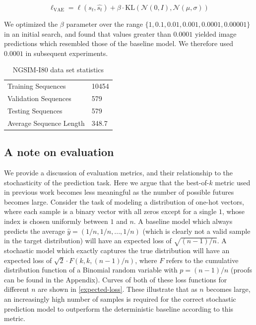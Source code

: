 \documentclass{article}
\begin{document}
\begin{appendices}
  \begin{equation}
    \ell_{\text{VAE}} = \ell(s_t, \hat{s_t}) + \beta \cdot \mbox{KL}(\mathcal{N}(0, I), \mathcal{N}(\mu, \sigma))
  \end{equation}

  We optimized the $\beta$ parameter over the range $\{1, 0.1, 0.01, 0.001, 0.0001, 0.00001 \}$ in an initial search, and found that values greater than $0.0001$ yielded image predictions which resembled those of the baseline model.
  We therefore used $0.0001$ in subsequent experiments.

  \begin{table}
    \caption{NGSIM-I80 data set statistics}
    \label{i80-stats}
    \centering
    \begin{tabular}{ll}
      \toprule
      Training Sequences     & 10454 \\
      Validation Sequences & 579 \\
      Testing Sequences & 579 \\
      Average Sequence Length & 348.7 \\
      \bottomrule
    \end{tabular}
  \end{table}

  \subsection{A note on evaluation} \label{proof}

  We provide a discussion of evaluation metrics, and their relationship to the stochasticity of the prediction task.
  Here we argue that the best-of-$k$ metric used in previous work \citep{Walker2016, Babaeizadeh2018, Denton2018} becomes less meaningful as the number of possible futures becomes large.
  Consider the task of modeling a distribution of one-hot vectors, where each sample is a binary vector with all zeros except for a single $1$, whose index is chosen uniformly between $1$ and $n$.
  A baseline model which always predicts the average $\hat{y} = (1/n, 1/n, ..., 1/n)$ (which is clearly not a valid sample in the target distribution) will have an expected loss of $\sqrt{(n-1)/n}$.
  A stochastic model which exactly captures the true distribution will have an expected loss of $\sqrt{2} \cdot F(k, k, (n-1)/n)$, where $F$ refers to the cumulative distribution function of a Binomial random variable with $p = (n-1)/n$ (proofs can be found in the Appendix).
  Curves of both of these loss functions for different $n$ are shown in \cref{expected-loss}.
  These illustrate that as $n$ becomes large, an increasingly high number of samples is required for the correct stochastic prediction model to outperform the deterministic baseline according to this metric.


\end{appendices}
\end{document}
